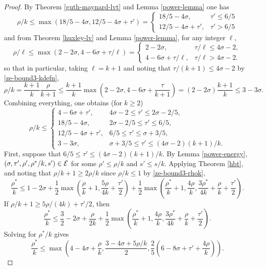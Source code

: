 \begin{proof}
By Theorem \ref{guth-maynard-lvt} and Lemma \ref{power-lemma} one has 
\[
\rho/k \le \max(18/5 - 4\sigma, 12/5 - 4\sigma + \tau') = \begin{cases}
18/5 - 4\sigma,& \tau' \le 6/5\\
12/5 - 4\sigma + \tau',&\tau' > 6/5
\end{cases}
\]
and from Theorem \ref{huxley-lv} and Lemma \ref{power-lemma}, for any integer $\ell$,
\[
\rho/\ell \le \max(2 -2\sigma, 4 - 6\sigma + \tau/\ell) = \begin{cases}
2 - 2\sigma,&\tau/\ell \le 4\sigma - 2,\\
4 - 6\sigma + \tau/\ell,& \tau/\ell > 4\sigma - 2.
\end{cases}
\]
so that in particular, taking $\ell = k + 1$ and noting that $\tau/(k + 1) \le 4\sigma - 2$ by \eqref{ze-bound3-kdefn}, 
\[
\rho/k = \frac{k + 1}{k}\frac{\rho}{k + 1} \le \frac{k + 1}{k}\max(2 - 2\sigma, 4 - 6\sigma + \frac{\tau}{k + 1}) = (2 - 2\sigma)\frac{k + 1}{k} \le 3 - 3\sigma. 
\]
Combining everything, one obtains (for $k \ge 2$)
\begin{equation}
\label{ze-bound3-rhok}
\rho/k \le \begin{cases}
4 - 6\sigma + \tau',& 4\sigma - 2 \le \tau' \le 2\sigma - 2/5,\\
18/5 - 4\sigma,& 2\sigma - 2/5 \le \tau' \le 6/5,\\
12/5 - 4\sigma + \tau', &6/5 \le \tau' \le \sigma + 3/5,\\
3 - 3\sigma,& \sigma + 3/5 \le \tau' \le (4\sigma - 2)(k + 1)/k.
\end{cases}
\end{equation}
First, suppose that $6/5 \le \tau' \le (4\sigma - 2)(k + 1)/k$. By Lemma \ref{power-energy}, $(\sigma, \tau', \rho', \rho^*/k, s') \in \mathcal{E}$ for some $\rho' \le \rho/k$ and $s' \le s/k$. Applying Theorem \ref{hbt}, and noting that $\rho/k + 1 \ge 2\rho/k$ since $\rho/k \le 1$ by \eqref{ze-bound3-rhok}, 
\[
\frac{\rho^*}{k} \le 1-2\sigma + \frac{1}{2}\max\left(\frac{\rho}{k}+1, \frac{5\rho}{4k} + \frac{\tau'}{2}\right) + \frac{1}{2}\max\left(\frac{\rho^*}{k}+1, \frac{4\rho}{k}, \frac{3\rho^*}{4k} +\frac{\rho}{k}+\frac{\tau'}{2}\right).
\]
If $\rho/k + 1 \ge 5\rho/(4k) + \tau'/2$, then 
\[
\frac{\rho^*}{k} \le \frac{3}{2} - 2\sigma + \frac{\rho}{2k} + \frac{1}{2}\max\left(\frac{\rho^*}{k}+1, \frac{4\rho}{k}, \frac{3\rho^*}{4k} +\frac{\rho}{k}+\frac{\tau'}{2}\right).
\]
Solving for $\rho^*/k$ gives
\[
\frac{\rho^*}{k} \le \max\left(4 - 4\sigma + \frac{\rho}{k}, \frac{3 - 4\sigma + 5\rho/k}{2}, \frac{2}{5}(6 - 8\sigma + \tau' + \frac{4\rho}{k})\right).
\]
\end{proof}
